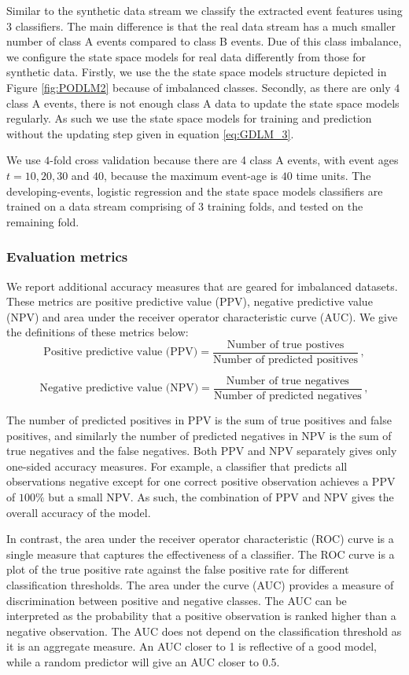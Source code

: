 \documentclass[11pt]{article}
\begin{document}
 	Similar to the synthetic data stream we classify the extracted event features using 3 classifiers. The main difference is that the real data stream has a much smaller number of class A events compared to class B events.  Due of this class imbalance, we configure the state space models for real data differently from  those for synthetic data.  Firstly, we use the the state space models structure depicted in Figure \ref{fig:PODLM2} because of imbalanced classes. Secondly, as there are only $4$ class A events, there is not enough class A data to update the state space models regularly. As such we use the state space models for training and prediction without the updating step given in equation \eqref{eq:GDLM_3}. 
 	
 	
 	We use $4$-fold cross validation because there are 4 class A events, with event ages  $t = 10, 20, 30$ and  $40$, because the maximum event-age is $40$ time units. The developing-events, logistic regression and the state space models classifiers  are trained on a data stream comprising of 3 training folds, and tested on the remaining fold. 
 	
	
 	\subsubsection{Evaluation metrics}
 	We report additional accuracy measures that are geared for imbalanced datasets. These metrics are positive predictive value (PPV), negative predictive value (NPV) and area under the receiver operator characteristic curve (AUC). We give the definitions of these metrics below:
 	$$ \text{Positive predictive value (PPV)} = \frac{ \text{Number of true postives} }{ \text{Number of predicted positives}  }  \, ,   $$ 
 	
 	$$ \text{Negative predictive value (NPV)} = \frac{ \text{Number of true negatives} }{ \text{Number of predicted negatives}  }  \, ,   $$ 
 	
 	\noindent
	The number of predicted positives in PPV is the sum of true positives and false positives, and similarly the number of predicted negatives in NPV is the sum of true negatives and the false negatives. Both PPV and NPV separately gives only  one-sided accuracy measures. For example, a classifier that predicts all observations negative except for one correct positive observation achieves a PPV of $100\%$ but a small NPV. As such, the combination of PPV and NPV gives the overall accuracy of the model. 
	
	In contrast, the area under the receiver operator characteristic (ROC) curve  is a single measure that captures the effectiveness of a classifier. The ROC curve is a plot of the true positive rate against the false positive rate for different classification thresholds. The area under the curve (AUC) provides a measure of discrimination between positive and negative classes. The AUC can be interpreted as the probability that a positive observation is ranked higher than a negative observation. The AUC does not depend on the classification threshold as it is an aggregate measure.  An AUC closer to 1 is reflective of a good model, while a random predictor will give an AUC closer to 0.5. 
	
\end{document}
